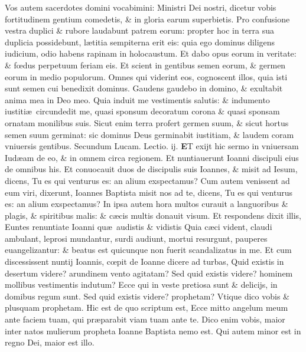 \documentclass[a5paper,10pt]{book}
\def\leftmarginnote{%
	\lrmarginnote{\hskip -\marginparsep \hskip -6.5em}}
\def\ae{æ}
\def\oe{œ}
\begin{document}
\begin{multicols*}{2}
Vos autem sacerdotes domini vocabimini: Ministri Dei nostri, dicetur vobis fortitudinem gentium comedetis, \& in gloria earum superbietis.
Pro confusione vestra duplici \& rubore laudabunt patrem eorum: propter hoc in terra sua duplicia possidebunt, l\ae titia sempiterna erit eis: quia ego dominus diligens iudicium, odio habens rapinam in holocaustum.
Et dabo opus eorum in veritate: \& f\oe dus perpetuum feriam eis.
Et scient in gentibus semen eorum, \& germen eorum in medio populorum.
Omnes qui viderint eos, cognoscent illos, quia isti sunt semen cui benedixit dominus.
Gaudens gaudebo in domino, \& exultabit anima mea in Deo meo.
Quia induit me vestimentis salutis: \& indumento iustiti\ae \ circundedit me, quasi sponsum decoratum corona \& quasi sponsam ornatam monilibus suis.
Sicut enim terra profert germen suum, \& sicut hortus semen suum germinat: sic dominus Deus germinabit iustitiam, \& laudem coram vniuersis gentibus.
\newline \color{red} Secundum Lucam. \hfill Lectio. ij. \color{black}
\vspace{-.25em}
\lettrine[lines=2]{\bfseries \color{red} E}{}T\leftmarginnote{\begin{flushright}ca. 7.\end{flushright}} exijt hic sermo in vniuersam Iud\ae am de eo, \& 
in omnem circa regionem.
Et nuntiauerunt Ioanni discipuli eius de omnibus his.
Et conuocauit duos de discipulis suis Ioannes, \& misit ad Iesum, dicens, Tu es qui venturus es: an alium exspectamus?
Cum autem venissent ad eum viri, dixerunt, Ioannes Baptista misit nos ad te, dicens, Tu es qui venturus es: an alium exspectamus?
In ipsa autem hora multos curauit a languoribus \& plagis, \& spiritibus malis: \& c\ae cis multis donauit visum.
Et respondens dixit illis, Euntes renuntiate Ioanni qu\ae \ audistis \& vidistis Quia c\ae ci vident, claudi ambulant, leprosi mundantur, surdi audiunt, mortui resurgunt, pauperes euangelizantur: \& beatus est quicunque non fuerit scandalizatus in me.
Et cum discessissent nuntij Ioannis, c\oe pit de Ioanne dicere ad turbas, Quid existis in desertum videre? arundinem vento agitatam?
Sed quid existis videre? hominem mollibus vestimentis indutum?
Ecce qui in veste pretiosa sunt \& delicijs, in domibus regum sunt. Sed quid existis videre? prophetam?
Vtique dico vobis \& plusquam prophetam.
Hic est de quo scriptum est, Ecce mitto angelum meum ante faciem tuam, qui pr\ae parabit viam tuam ante te.
Dico enim vobis, maior inter natos mulierum propheta Ioanne Baptista nemo est.
Qui autem minor est in regno Dei, maior est illo.

\end{multicols*}
\end{document}
